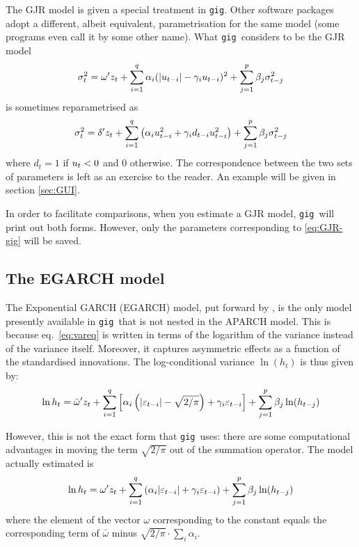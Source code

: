 \documentclass[a4paper,11pt]{article}
\newcommand{\stdu}{\ensuremath \varepsilon}
\newcommand{\uhat}{\ensuremath u}
\newcommand{\gig}{\texttt{gig}}
\begin{document}
The GJR model is given a special treatment in \gig. Other software
packages adopt a different, albeit equivalent, parametrisation for the
same model (some programs even call it by some other name). What \gig\
considers to be the GJR model
\begin{equation} \label{eq:GJR-gig} \sigma_t^2 = \omega'z_t +
  \sum_{i=1}^q \alpha_i(|\uhat_{t-i}| - \gamma_i
  \uhat_{t-i})^2 + \sum_{j=1}^p\beta_j\sigma_{t-j}^2
\end{equation}
is sometimes reparametrised as
\begin{equation} \label{eq:GJR-eviews} \sigma_t^2 = \delta'z_t +
  \sum_{i=1}^q \left( \alpha_i \uhat_{t-i}^2 + \gamma_i d_{t-i}
  \uhat_{t-i}^2 \right) + \sum_{j=1}^p\beta_j\sigma_{t-j}^2
\end{equation}
where $d_t = 1$ if $\uhat_{t}<0$ and 0 otherwise. The correspondence
between the two sets of parameters is left as an exercise to the
reader. An example will be given in section \ref{sec:GUI}.

In order to facilitate comparisons, when you estimate a GJR model,
\gig\ will print out both forms. However, only the parameters
corresponding to \eqref{eq:GJR-gig} will be saved.

\subsection{The EGARCH model}
\label{sec:EGARCH}

The Exponential GARCH (EGARCH) model, put forward by \cite{Nelson}, is
the only model presently available in \gig\ that is not nested
in the APARCH model. This is because eq.~\eqref{eq:vareq} is written
in terms of the logarithm of the variance instead of the variance
itself. Moreover, it captures asymmetric effects as a function of the
standardised innovations. The log-conditional variance $\ln(h_t)$ is
thus given by:
\begin{equation}\label{eq:egarch-0}
  \ln h_t = \bar{\omega}'z_t  +
  \sum_{i=1}^q \left[
    \alpha_i \left( |\stdu_{t-i}| - \sqrt{2/\pi}\right) + \gamma_i \stdu_{t-i}
  \right]+
  \sum_{j=1}^p \beta_j \ln(h_{t-j})
\end{equation}

However, this is not the exact form that \gig\ uses: there are some
computational advantages in moving the term $\sqrt{2/\pi}$ out of the
summation operator. The model actually estimated is
\begin{equation}\label{eq:egarch}
  \ln h_t = \omega'z_t  +
  \sum_{i=1}^q \left( \alpha_i |\stdu_{t-i}| + \gamma_i \stdu_{t-i} \right)+
  \sum_{j=1}^p \beta_j \ln(h_{t-j})
\end{equation}
where the element of the vector $\omega$ corresponding to the constant
equals the corresponding term of $\bar{\omega}$ minus $\sqrt{2/\pi}
\cdot \sum_{i} \alpha_i$.
\end{document}
